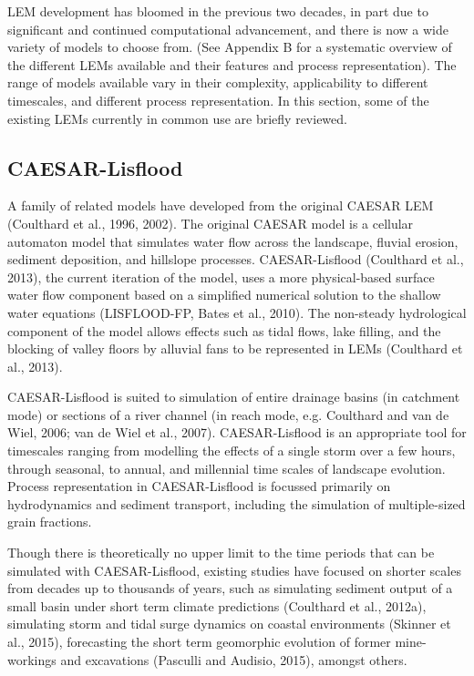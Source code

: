 LEM development has bloomed in the previous two decades, in part due to significant and continued computational advancement, and there is now a wide variety of models to choose from. (See Appendix B for a systematic overview of the different LEMs available and their features and process representation). The range of models available vary in their complexity, applicability to different timescales, and different process representation. In this section, some of the existing LEMs currently in common use are briefly reviewed.

\subsection{CAESAR-Lisflood}

A family of related models have developed from the original CAESAR LEM (Coulthard et al., 1996, 2002). The original CAESAR model is a cellular automaton model that simulates water flow across the landscape, fluvial erosion, sediment deposition, and hillslope processes. CAESAR-Lisflood (Coulthard et al., 2013), the current iteration of the model, uses a more physical-based surface water flow component based on a simplified numerical solution to the shallow water equations (LISFLOOD-FP, Bates et al., 2010). The non-steady hydrological component of the model allows effects such as tidal flows, lake filling, and the blocking of valley floors by alluvial fans to be represented in LEMs (Coulthard et al., 2013). 

CAESAR-Lisflood is suited to simulation of entire drainage basins (in catchment mode) or sections of a river channel (in reach mode, e.g. Coulthard and van de Wiel, 2006; van de Wiel et al., 2007). CAESAR-Lisflood is an appropriate tool for timescales ranging from modelling the effects of a single storm over a few hours, through seasonal, to annual, and millennial time scales of landscape evolution. Process representation in CAESAR-Lisflood is focussed primarily on hydrodynamics and sediment transport, including the simulation of multiple-sized grain fractions. 

Though there is theoretically no upper limit to the time periods that can be simulated with CAESAR-Lisflood, existing studies have focused on shorter scales from decades up to thousands of years, such as simulating sediment output of a small basin under short term climate predictions (Coulthard et al., 2012a), simulating storm and tidal surge dynamics on coastal environments (Skinner et al., 2015), forecasting the short term geomorphic evolution of former mine-workings and excavations (Pasculli and Audisio, 2015), amongst others. 

